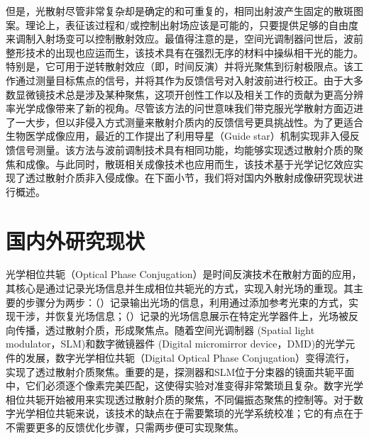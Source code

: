 但是，光散射尽管非常复杂却是确定的和可重复的，相同出射波产生固定的散斑图案。理论上，表征该过程和/或控制出射场应该是可能的，只要提供足够的自由度来调制入射场变可以控制散射效应。最值得注意的是，空间光调制器问世后，波前整形技术的出现也应运而生，该技术具有在强烈无序的材料中操纵相干光的能力。特别是，它可用于逆转散射效应（即，时间反演）并将光聚焦到衍射极限点\cite{Vellekoop2007}。该工作通过测量目标焦点的信号，并将其作为反馈信号对入射波前进行校正。由于大多数显微镜技术总是涉及某种聚焦，这项开创性工作以及相关工作的贡献为更高分辨率光学成像带来了新的视角。尽管该方法的问世意味我们带克服光学散射方面迈进了一大步，但以非侵入方式测量来散射介质内的反馈信号更具挑战性。为了更适合生物医学成像应用，最近的工作提出了利用导星（Guide star）机制实现非入侵反馈信号测量。该方法与波前调制技术具有相同功能，均能够实现透过散射介质的聚焦和成像。与此同时，散斑相关成像技术也应用而生，该技术基于光学记忆效应实现了透过散射介质非入侵成像。在下面小节，我们将对国内外散射成像研究现状进行概述。

\section{国内外研究现状}

光学相位共轭（Optical Phase Conjugation）是时间反演技术在散射方面的应用\cite{derode_robust_1995,draeger_one_channel_1997,leith_holographic_1966,fink_acoustic_2001}，其核心是通过记录光场信息并生成相位共轭光的方式，实现入射光场的重现。其主要的步骤分为两步：（）记录输出光场的信息，利用通过添加参考光束的方式，实现干涉，并恢复光场信息；（）记录的光场信息展示在特定光学器件上，光场被反向传播，透过散射介质，形成聚焦点。随着空间光调制器 (Spatial light modulator，SLM)和数字微镜器件 (Digital micromirror device，DMD)的光学元件的发展，数字光学相位共轭（Digital Optical Phase Conjugation）变得流行，实现了透过散射介质聚焦\cite{yaqoob_optical_2008,paurisse_phase_2009,cui_implementation_2010,lhermite_coherent_2010}。重要的是，探测器和SLM位于分束器的镜面共轭平面中，它们必须逐个像素完美匹配，这使得实验对准变得非常繁琐且复杂。数字光学相位共轭开始被用来实现透过散射介质的聚焦，不同偏振态聚焦的控制等。对于数字光学相位共轭来说，该技术的缺点在于需要繁琐的光学系统校准；它的有点在于不需要更多的反馈优化步骤，只需两步便可实现聚焦。


